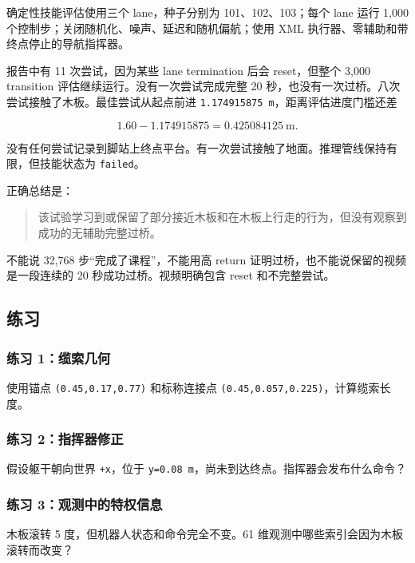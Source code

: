 \documentclass[
  chinese,
  11pt,
  letterpaper,
]{article}
\begin{document}
确定性技能评估使用三个 lane，种子分别为 101、102、103；每个 lane 运行
1,000 个控制步；关闭随机化、噪声、延迟和随机偏航；使用 XML
执行器、零辅助和带终点停止的导航指挥器。

报告中有 11 次尝试，因为某些 lane termination 后会 reset，但整个 3,000
transition 评估继续运行。没有一次尝试完成完整 20
秒，也没有一次过桥。八次尝试接触了木板。最佳尝试从起点前进
\texttt{1.174915875\ m}，距离评估进度门槛还差

\[
1.60-1.174915875
=0.425084125\ \text{m}.
\]

没有任何尝试记录到脚站上终点平台。有一次尝试接触了地面。推理管线保持有限，但技能状态为
\texttt{failed}。

正确总结是：

\begin{quote}
该试验学习到或保留了部分接近木板和在木板上行走的行为，但没有观察到成功的无辅助完整过桥。
\end{quote}

不能说 32,768 步``完成了课程''，不能用高 return
证明过桥，也不能说保留的视频是一段连续的 20 秒成功过桥。视频明确包含
reset 和不完整尝试。

\subsection{练习}\label{ux7ec3ux4e60-2}

\subsubsection{练习
1：缆索几何}\label{ux7ec3ux4e60-1ux7f06ux7d22ux51e0ux4f55}

使用锚点 \texttt{(0.45,0.17,0.77)} 和标称连接点
\texttt{(0.45,0.057,0.225)}，计算缆索长度。

\subsubsection{练习
2：指挥器修正}\label{ux7ec3ux4e60-2ux6307ux6325ux5668ux4feeux6b63}

假设躯干朝向世界 \texttt{+x}，位于
\texttt{y=0.08\ m}，尚未到达终点。指挥器会发布什么命令？

\subsubsection{练习
3：观测中的特权信息}\label{ux7ec3ux4e60-3ux89c2ux6d4bux4e2dux7684ux7279ux6743ux4fe1ux606f}

木板滚转 5 度，但机器人状态和命令完全不变。61
维观测中哪些索引会因为木板滚转而改变？
\end{document}
